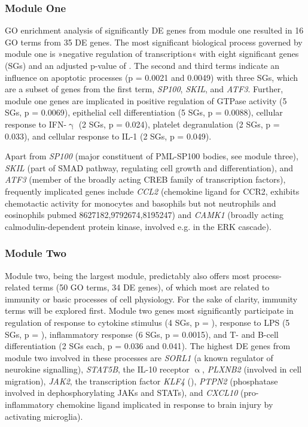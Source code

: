 \subsubsection{Module One}
GO enrichment analysis of significantly DE genes from module one resulted in 16 GO terms from 35 DE genes. The most significant biological process governed by module one is »negative regulation of transcription« with eight significant genes (SGs) and an adjusted p-value of . The second and third terms indicate an influence on apoptotic processes (p = 0.0021 and 0.0049) with three SGs, which are a subset of genes from the first term, \emph{SP100}, \emph{SKIL}, and \emph{ATF3}. Further, module one genes are implicated in positive regulation of GTPase activity (5 SGs, p = 0.0069), epithelial cell differentiation (5 SGs, p = 0.0088), cellular response to IFN-$\upgamma$ (2 SGs, p = 0.024), platelet degranulation (2 SGs, p = 0.033), and cellular response to IL-1 (2 SGs, p = 0.049).

Apart from \emph{SP100} (major constituent of PML-SP100 bodies, see module three), \emph{SKIL} (part of SMAD pathway, regulating cell growth and differentiation), and \emph{ATF3} (member of the broadly acting CREB family of transcription factors), frequently implicated genes include \emph{CCL2} (chemokine ligand for CCR2, exhibits chemotactic activity for monocytes and basophils but not neutrophils and eosinophils pubmed 8627182,9792674,8195247) and \emph{CAMK1} (broadly acting calmodulin-dependent protein kinase, involved e.g. in the ERK cascade).

\subsubsection{Module Two}
Module two, being the largest module, predictably also offers most process-related terms (50 GO terms, 34 DE genes), of which most are related to immunity or basic processes of cell physiology. For the sake of clarity, immunity terms will be explored first. Module two genes most significantly participate in regulation of response to cytokine stimulus (4 SGs, p = ), response to LPS (5 SGs, p = ), inflammatory response (6 SGs, p = 0.0015), and T- and B-cell differentiation (2 SGs each, p = 0.036 and 0.041). The highest DE genes from module two involved in these processes are \emph{SORL1} (a known regulator of neurokine signalling), \emph{STAT5B}, the IL-10 receptor $\upalpha$, \emph{PLXNB2} (involved in cell migration),  \emph{JAK2}, the transcription factor \emph{KLF4} (), \emph{PTPN2} (phosphatase involved in dephosphorylating JAKs and STATs), and \emph{CXCL10} (pro-inflammatory chemokine ligand implicated in response to brain injury by activating microglia).
 
